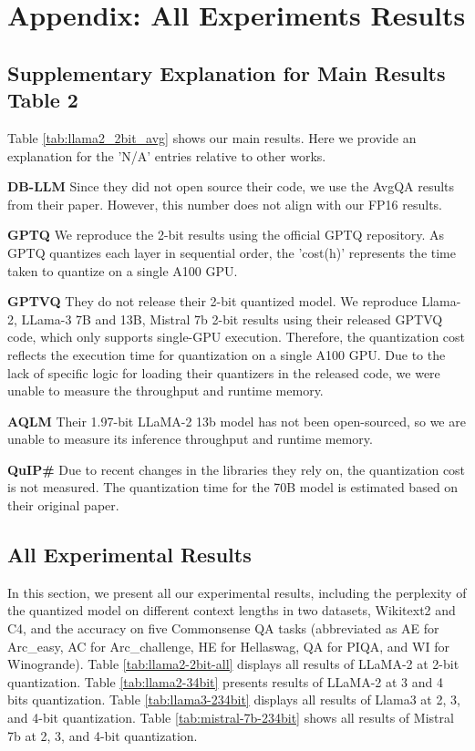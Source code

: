 \section{Appendix: All Experiments Results}
\label{appdx}


\subsection{Supplementary Explanation for Main Results Table 2}
\label{appendix:na_explain}
Table \ref{tab:llama2_2bit_avg} shows our main results. Here we provide an explanation for the 'N/A' entries relative to other works.

\textbf{DB-LLM} Since they did not open source their code, we use the AvgQA results from their paper. However, this number does not align with our FP16 results.

\textbf{GPTQ} We reproduce the 2-bit results using the official GPTQ repository. As GPTQ quantizes each layer in sequential order, the 'cost(h)' represents the time taken to quantize on a single A100 GPU.

\textbf{GPTVQ} They do not release their 2-bit quantized model. We reproduce Llama-2, LLama-3 7B and 13B, Mistral 7b 2-bit results using their released GPTVQ code, which only supports single-GPU execution. Therefore, the quantization cost reflects the execution time for quantization on a single A100 GPU. Due to the lack of specific logic for loading their quantizers in the released code, we were unable to measure the throughput and runtime memory.

\textbf{AQLM} Their 1.97-bit LLaMA-2 13b model has not been open-sourced, so we are unable to measure its inference throughput and runtime memory.

\textbf{QuIP\#} Due to recent changes in the libraries they rely on, the quantization cost is not measured. The quantization time for the 70B model is estimated based on their original paper.

\subsection{All Experimental Results}
In this section, we present all our experimental results, including the perplexity of the quantized model on different context lengths in two datasets, Wikitext2 and C4, and the accuracy on five Commonsense QA tasks (abbreviated as AE for Arc\_easy, AC for Arc\_challenge, HE for Hellaswag, QA for PIQA, and WI for Winogrande). Table \ref{tab:llama2-2bit-all} displays all results of LLaMA-2 at 2-bit quantization. Table \ref{tab:llama2-34bit} presents results of LLaMA-2 at 3 and 4 bits quantization. Table \ref{tab:llama3-234bit} displays all results of Llama3 at 2, 3, and 4-bit quantization. Table \ref{tab:mistral-7b-234bit} shows all results of Mistral 7b at 2, 3, and 4-bit quantization.







